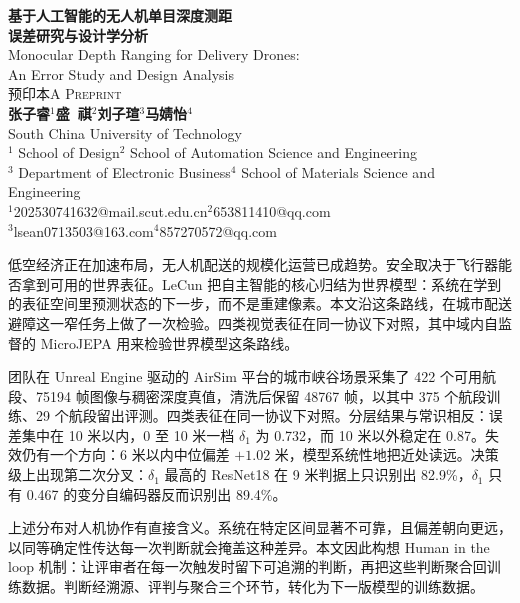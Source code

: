 \documentclass[12pt,a4paper]{ctexart}
\begin{document}
\begin{center}
{\bfseries 基于人工智能的无人机单目深度测距}\\[2pt]
{\bfseries 误差研究与设计学分析}\\[6pt]
{Monocular Depth Ranging for Delivery Drones:}\\[2pt]
{An Error Study and Design Analysis}\\[10pt]

{\textsc{预印本}\quad\textsc{A Preprint}}\\[12pt]

{\bfseries 张子睿$^{1}$\quad 盛\ 祺$^{2}$\quad 刘子瑄$^{3}$\quad 马婧怡$^{4}$}\\[8pt]

{South China University of Technology\\
$^{1}$ School of Design\quad $^{2}$ School of Automation Science and Engineering\\
$^{3}$ Department of Electronic Business\quad $^{4}$ School of Materials Science and Engineering}\\[5pt]

{$^{1}$202530741632@mail.scut.edu.cn\quad $^{2}$653811410@qq.com\\[2pt]
$^{3}$lsean0713503@163.com\quad $^{4}$857270572@qq.com}
\end{center}

\vspace{0.4cm}

低空经济正在加速布局，无人机配送的规模化运营已成趋势。安全取决于飞行器能否拿到可用的世界表征。LeCun 把自主智能的核心归结为世界模型：系统在学到的表征空间里预测状态的下一步，而不是重建像素。本文沿这条路线，在城市配送避障这一窄任务上做了一次检验。四类视觉表征在同一协议下对照，其中域内自监督的 MicroJEPA 用来检验世界模型这条路线。

团队在 Unreal Engine 驱动的 AirSim 平台的城市峡谷场景采集了 422 个可用航段、75194 帧图像与稠密深度真值，清洗后保留 48767 帧，以其中 375 个航段训练、29 个航段留出评测。四类表征在同一协议下对照。分层结果与常识相反：误差集中在 10 米以内，0 至 10 米一档 $\delta_1$ 为 0.732，而 10 米以外稳定在 0.87。失效仍有一个方向：6 米以内中位偏差 $+1.02$ 米，模型系统性地把近处读远。决策级上出现第二次分叉：$\delta_1$ 最高的 ResNet18 在 9 米判据上只识别出 82.9\%，$\delta_1$ 只有 0.467 的变分自编码器反而识别出 89.4\%。

上述分布对人机协作有直接含义。系统在特定区间显著不可靠，且偏差朝向更远，以同等确定性传达每一次判断就会掩盖这种差异。本文因此构想 Human in the loop 机制：让评审者在每一次触发时留下可追溯的判断，再把这些判断聚合回训练数据。判断经溯源、评判与聚合三个环节，转化为下一版模型的训练数据。
\end{document}
